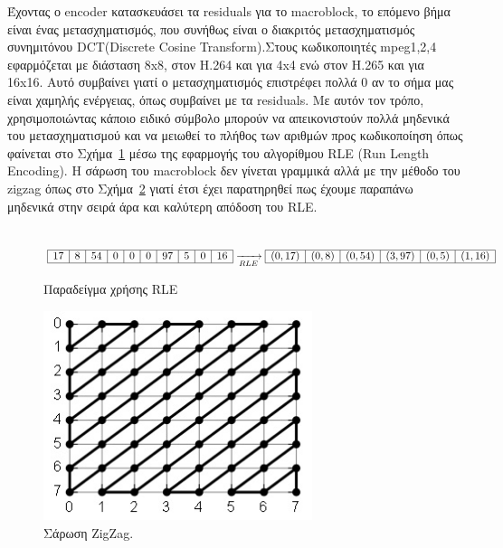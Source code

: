 \indent Έχοντας ο encoder κατασκευάσει τα residuals για το macroblock, το επόμενο βήμα είναι ένας μετασχηματισμός, που συνήθως είναι ο διακριτός μετασχηματισμός συνημιτόνου DCT(Discrete Cosine Transform).Στους κωδικοποιητές mpeg1,2,4 εφαρμόζεται με διάσταση 8x8, στον H.264 και για 4x4 ενώ στον Η.265 και για 16x16. Αυτό συμβαίνει γιατί ο μετασχηματισμός επιστρέφει πολλά 0 αν το σήμα μας είναι χαμηλής ενέργειας, όπως συμβαίνει με τα residuals. Με αυτόν τον τρόπο, χρησιμοποιώντας κάποιο ειδικό σύμβολο μπορούν να απεικονιστούν πολλά μηδενικά του μετασχηματισμού και να μειωθεί το πλήθος των αριθμών προς κωδικοποίηση όπως φαίνεται στο Σχήμα~\ref{eq:rle} μέσω της εφαρμογής του αλγορίθμου RLE (Run Length Encoding). Η σάρωση του macroblock δεν γίνεται γραμμικά αλλά με την μέθοδο του zigzag όπως στο Σχήμα~\ref{fig:zigzag} γιατί έτσι έχει παρατηρηθεί πως έχουμε παραπάνω μηδενικά στην σειρά άρα και καλύτερη απόδοση του RLE.
\\
\\
\begin{figure}[H]
\centering
$
\begin{array}{| c | c | c | c | c | c | c | c | c | c |}
    \hline 17 & 8 & 54 & 0 & 0 & 0 & 97 & 5 & 0 & 16 \\ \hline
\end{array}
\xrightarrow[RLE]{}
\begin{array}{| c | c | c | c | c | c |}
    \hline (0,17) & (0,8) & (0,54) & (3,97) & (0,5) & (1,16) \\ \hline
\end{array}
$
\caption{Παραδείγμα χρήσης RLE}
\label{eq:rle}
\end{figure}

\begin{figure}[H]
  \centering
  \includegraphics[width=0.7\textwidth]{chapter2/zigzag.jpg}
  \caption{Σάρωση ZigZag. \cite{misc:zigzag}}
  \label{fig:zigzag}
\end{figure}


